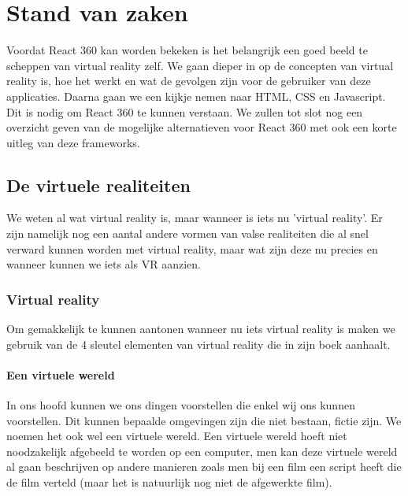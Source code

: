 \chapter{Stand van zaken}
\label{ch:stand-van-zaken}



Voordat React 360 kan worden bekeken is het belangrijk een goed beeld te scheppen van virtual reality zelf. We gaan dieper in op de concepten van virtual reality is, hoe het werkt en wat de gevolgen zijn voor de gebruiker van deze applicaties. Daarna gaan we een kijkje nemen naar HTML, CSS en Javascript. Dit is nodig om React 360 te kunnen verstaan. We zullen tot slot nog een overzicht geven van de mogelijke alternatieven voor React 360 met ook een korte uitleg van deze frameworks.

\section{De virtuele realiteiten}
\label{secvirtuele-realiteiten}
We weten al wat virtual reality is, maar wanneer is iets nu 'virtual reality'. Er zijn namelijk nog een aantal andere vormen van valse realiteiten die al snel verward kunnen worden met virtual reality, maar wat zijn deze nu precies en wanneer kunnen we iets als VR aanzien.

\subsection{Virtual reality}
\label{subsec:virtual-reality}
Om gemakkelijk te kunnen aantonen wanneer nu iets virtual reality is maken we gebruik van de 4 sleutel elementen van virtual reality die \autocite{Sherman2000} in zijn boek aanhaalt.

\subsubsection{Een virtuele wereld}
\label{ssubsec:virtuele-wereld}
In ons hoofd kunnen we ons dingen voorstellen die enkel wij ons kunnen voorstellen. Dit kunnen bepaalde omgevingen zijn die niet bestaan, fictie zijn. We noemen het ook wel een virtuele wereld. Een virtuele wereld hoeft niet noodzakelijk afgebeeld te worden op een computer, men kan deze virtuele wereld al gaan beschrijven op andere manieren zoals men bij een film een script heeft die de film verteld (maar het is natuurlijk nog niet de afgewerkte film).

